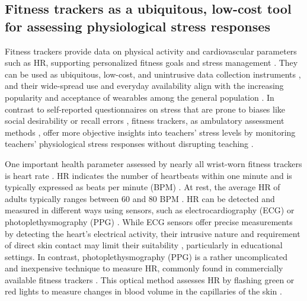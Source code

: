 \documentclass[preprint, 3p,
sort,]{elsarticle} %
\begin{document}
\subsection{Fitness trackers as a ubiquitous, low-cost tool for
assessing physiological stress
responses}\label{fitness-trackers-as-a-ubiquitous-low-cost-tool-for-assessing-physiological-stress-responses}

Fitness trackers provide data on physical activity and cardiovascular
parameters such as HR, supporting personalized fitness goals
\citep{nuss2021effects} and stress management \citep{hao2018chrv}. They
can be used as ubiquitous, low-cost, and unintrusive data collection
instruments \citep{godfrey2018z}, and their wide-spread use and everyday
availability align with the increasing popularity and acceptance of
wearables among the general population \citep{peng2022acceptance}. In
contrast to self-reported questionnaires on stress
\citep{chaplain2008, liu2020} that are prone to biases like social
desirability \citep{razavi2001self} or recall errors
\citep{van2016accuracy}, fitness trackers, as ambulatory assessment
methods \citep{trull2013ambulatory, wettstein2020ambulatory}, offer more
objective insights into teachers' stress levels by monitoring teachers'
physiological stress responses without disrupting teaching
\citep{donker2018, runge2020}.

One important health parameter assessed by nearly all wrist-worn fitness
trackers is heart rate \citep{scalise2018wearables}. HR indicates the
number of heartbeats within one minute and is typically expressed as
beats per minute (BPM)
\citep{berntson2007cardiovascular, hottenrott2007}. At rest, the average
HR of adults typically ranges between 60 and 80 BPM
\citep{sammito2015guideline}. HR can be detected and measured in
different ways using sensors, such as electrocardiography (ECG) or
photoplethysmography (PPG) \citep{mukhopadhyay2017wearable}. While ECG
sensors offer precise measurements by detecting the heart's electrical
activity, their intrusive nature and requirement of direct skin contact
may limit their suitability \citep{kranjec2014non}, particularly in
educational settings. In contrast, photoplethysmography (PPG) is a
rather uncomplicated and inexpensive technique to measure HR, commonly
found in commercially available fitness trackers
\citep{castaneda2018review}. This optical method assesses HR by flashing
green or red lights to measure changes in blood volume in the
capillaries of the skin \citep{allen2007photoplethysmography}.
\end{document}
